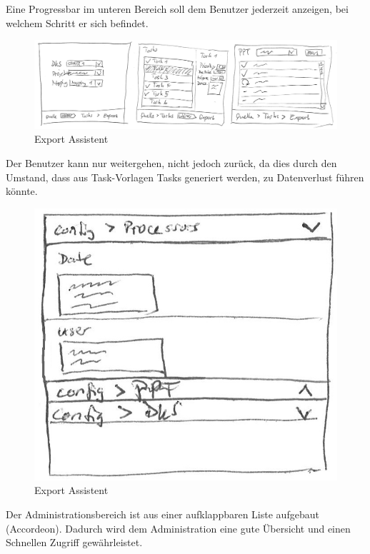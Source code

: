 	Eine Progressbar im unteren Bereich soll dem Benutzer jederzeit anzeigen, bei welchem Schritt er sich befindet.
	
	\begin{figure}[H]
		\includegraphics[width=\linewidth]{interfacesAndProtocols/media/img/exportWorkflow.jpg}
		\caption{Export Assistent}
		\label{fig:exportAssistent}
	\end{figure}	
	
	Der Benutzer kann nur weitergehen, nicht jedoch zurück, da dies durch den Umstand, 
	dass aus Task-Vorlagen Tasks generiert werden, 
	zu Datenverlust führen könnte.
	
	\begin{figure}[H]
		\centering
		\includegraphics[width=0.3\linewidth]{interfacesAndProtocols/media/img/administration.jpg}
		\caption{Export Assistent}
		\label{fig:administration}
	\end{figure}	
	
	Der Administrationsbereich ist aus einer aufklappbaren Liste aufgebaut (Accordeon). Dadurch wird dem Administration eine gute Übersicht und einen Schnellen Zugriff gewährleistet.